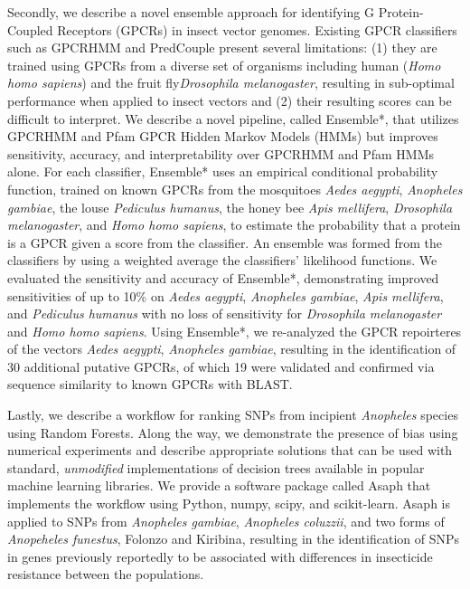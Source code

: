 Secondly, we describe a novel ensemble approach for identifying G Protein-Coupled Receptors (GPCRs) in insect vector genomes.  Existing GPCR classifiers such as GPCRHMM and PredCouple present several limitations: (1) they are trained using GPCRs from a diverse set of organisms including human (\emph{Homo homo sapiens}) and the fruit fly\emph{Drosophila melanogaster}, resulting in sub-optimal performance when applied to insect vectors and (2) their resulting scores can be difficult to interpret.  We describe a novel pipeline, called Ensemble*, that utilizes GPCRHMM and Pfam GPCR Hidden Markov Models (HMMs) but improves sensitivity, accuracy, and interpretability over GPCRHMM and Pfam HMMs alone. For each classifier, Ensemble* uses an empirical conditional probability function, trained on known GPCRs from the mosquitoes \emph{Aedes aegypti}, \emph{Anopheles gambiae}, the louse \emph {Pediculus humanus}, the honey bee \emph{Apis mellifera}, \emph{Drosophila melanogaster}, and \emph{Homo homo sapiens}, to estimate the probability that a protein is a GPCR given a score from the classifier.  An ensemble was formed from the classifiers by using a weighted average the classifiers' likelihood functions.  We evaluated the sensitivity and accuracy of Ensemble*, demonstrating improved sensitivities of up to 10\% on \emph{Aedes aegypti}, \emph{Anopheles gambiae}, \emph{Apis mellifera}, and \emph{Pediculus humanus} with no loss of sensitivity for \emph{Drosophila melanogaster} and \emph{Homo homo sapiens}. Using Ensemble*, we re-analyzed the GPCR repoirteres of the vectors \emph{Aedes aegypti}, \emph{Anopheles gambiae}, resulting in the identification of 30 additional putative GPCRs, of which 19 were validated and confirmed via sequence similarity to known GPCRs with BLAST.

Lastly, we describe a workflow for ranking SNPs from incipient \emph{Anopheles} species using Random Forests.  Along the way, we demonstrate the presence of bias using numerical experiments and describe appropriate solutions that can be used with standard, \emph{unmodified} implementations of decision trees available in popular machine learning libraries. We provide a software package called Asaph that implements the workflow using Python, numpy, scipy, and scikit-learn.  Asaph is applied to SNPs from \emph{Anopheles gambiae}, \emph{Anopheles coluzzii}, and two forms of \emph{Anopeheles funestus}, Folonzo and Kiribina, resulting in the identification of SNPs in genes previously reportedly to be associated with differences in insecticide resistance between the populations.

